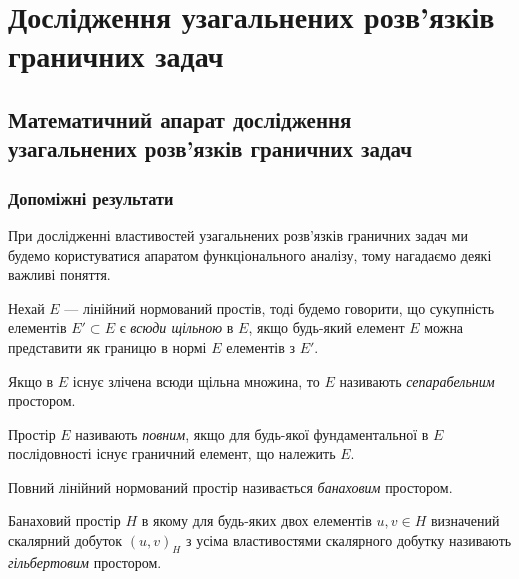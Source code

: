 \setcounter{section}{4}

\section{Дослідження узагальнених розв'язків \texorpdfstring{\\}{} граничних задач}

\subsection{Математичний апарат дослідження \texorpdfstring{\\}{} узагальнених розв'язків граничних задач}

\subsubsection{Допоміжні результати}

При дослідженні властивостей узагальнених розв'язків граничних задач ми будемо користуватися апаратом функціонального аналізу, тому нагадаємо деякі важливі поняття.

\begin{definition}
    Нехай $E$ --- лінійний нормований простів, тоді будемо говорити, що сукупність елементів $E' \subset E$ є \emph{всюди щільною} в $E$, якщо будь-який елемент $E$ можна представити як границю в нормі $E$ елементів з $E'$.
\end{definition}

\begin{definition}
    Якщо в $E$ існує злічена всюди щільна множина, то $E$ називають \emph{сепарабельним} простором.
\end{definition}

\begin{definition}
    Простір $E$ називають \emph{повним}, якщо для будь-якої фундаментальної в $E$ послідовності існує граничний елемент, що належить $E$.
\end{definition}

\begin{definition}
    Повний лінійний нормований простір називається \emph{банаховим} простором.
\end{definition}

\begin{definition}
    Банаховий простір $H$ в якому для будь-яких двох елементів $u, v \in H$ визначений скалярний добуток $(u, v)_H$ з усіма властивостями скалярного добутку називають \emph{гільбертовим} простором.
\end{definition}

